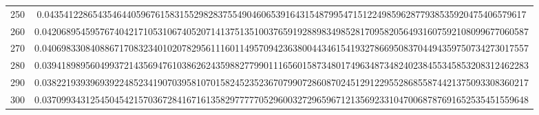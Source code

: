 \documentclass[final]{article}
\begin{document}
\begin{table}
\begin{center}
\begin{tabular}{|c|c|}
250 &   0.0435412286543546440596761583155298283755490460653916431548799547151224985962877938535920475406579617  \\
260 &   0.04206895459576740421710531067405207141375135100376591928898349852817095820564931607592108099677060587 \\
270 &   0.04069833084088671708323401020782956111601149570942363800443461541932786695083704494359750734273017557 \\
280 &   0.03941898956049937214356947610386262435988277990111656015873480174963487348240238455345853208312462283 \\
290 &   0.03822193939693922485234190703958107015824523523670799072860870245129122955286855874421375093308360217 \\
300 &   0.03709934312545045421570367284167161358297777705296003272965967121356923310470068787691652535451559648 \\
\hline
\hline
\end{tabular}
\end{center}
\bigskip\bigskip
\end{table}
\end{document}
